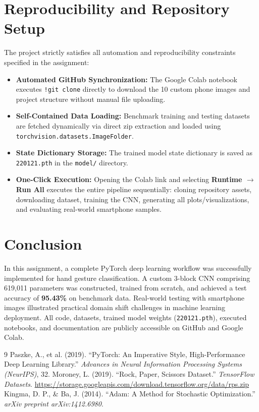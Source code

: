 \documentclass[11pt,a4paper]{article}
\begin{document}
\section{Reproducibility and Repository Setup}
The project strictly satisfies all automation and reproducibility constraints specified in the assignment:
\begin{itemize}[leftmargin=1.5em, itemsep=2pt]
    \item \textbf{Automated GitHub Synchronization:} The Google Colab notebook executes \texttt{!git clone} directly to download the 10 custom phone images and project structure without manual file uploading.
    \item \textbf{Self-Contained Data Loading:} Benchmark training and testing datasets are fetched dynamically via direct zip extraction and loaded using \texttt{torchvision.datasets.ImageFolder}.
    \item \textbf{State Dictionary Storage:} The trained model state dictionary is saved as \texttt{220121.pth} in the \texttt{model/} directory.
    \item \textbf{One-Click Execution:} Opening the Colab link and selecting \textbf{Runtime $\to$ Run All} executes the entire pipeline sequentially: cloning repository assets, downloading dataset, training the CNN, generating all plots/visualizations, and evaluating real-world smartphone samples.
\end{itemize}

\section{Conclusion}
In this assignment, a complete PyTorch deep learning workflow was successfully implemented for hand gesture classification. A custom 3-block CNN comprising 619,011 parameters was constructed, trained from scratch, and achieved a test accuracy of \textbf{95.43\%} on benchmark data. Real-world testing with smartphone images illustrated practical domain shift challenges in machine learning deployment. All code, datasets, trained model weights (\texttt{220121.pth}), executed notebooks, and documentation are publicly accessible on GitHub and Google Colab.

\begin{thebibliography}{9}
Paszke, A., et al. (2019). ``PyTorch: An Imperative Style, High-Performance Deep Learning Library.'' \textit{Advances in Neural Information Processing Systems (NeurIPS)}, 32.
Moroney, L. (2019). ``Rock, Paper, Scissors Dataset.'' \textit{TensorFlow Datasets}. \url{https://storage.googleapis.com/download.tensorflow.org/data/rps.zip}
Kingma, D. P., \& Ba, J. (2014). ``Adam: A Method for Stochastic Optimization.'' \textit{arXiv preprint arXiv:1412.6980}.
\end{thebibliography}
\end{document}
